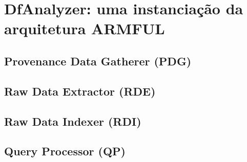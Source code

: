 \section{DfAnalyzer: uma instanciação da arquitetura ARMFUL}


\subsection{Provenance Data Gatherer (PDG)}

\subsection{Raw Data Extractor (RDE)}

\subsection{Raw Data Indexer (RDI)}

\subsection{Query Processor (QP)}